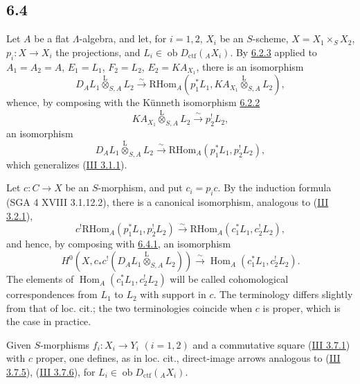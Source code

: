 \documentclass[11pt]{article}
\DeclareMathOperator{\Hom}{Hom}
\providecommand{\RHom}{\mathrm{RHom}}
\providecommand{\lten}{\overset{\mathrm L}{\otimes}}
\providecommand{\Ob}{\operatorname{ob}}
\providecommand{\RHom}{\mathrm{RHom}}
\providecommand{\Hom}{\operatorname{Hom}}
\providecommand{\lten}{\overset{\mathrm L}{\otimes}}
\providecommand{\RHom}{\mathrm R\mathcal{H}om}
\providecommand{\lten}{\overset{\mathrm L}{\otimes}}
\providecommand{\Ob}{\operatorname{ob}}
\providecommand{\lten}{\overset{\mathrm L}{\otimes}}
\providecommand{\lten}{\overset{\mathrm L}{\otimes}}
\providecommand{\Ob}{\operatorname{Ob}}
\providecommand{\lten}{\overset{\mathrm L}{\otimes}}
\providecommand{\RHom}{\mathrm{RHom}}
\providecommand{\Hom}{\operatorname{Hom}}
\providecommand{\Ob}{\operatorname{ob}}
\providecommand{\Ob}{\operatorname{Ob}}
\providecommand{\lten}{\overset{\mathrm L}{\otimes}}
\begin{document}
\subsection*{6.4}\label{sga5:IIIB:subsection:6.4}
Let $A$ be a flat $\Lambda$-algebra, and let, for $i=1,2$, $X_i$ be an $S$-scheme, $X=X_1\times_SX_2$, $p_i:X\to X_i$ the projections, and $L_i\in\Ob D_{\mathrm{ctf}}({}_AX_i)$. By \hyperref[sga5:IIIB:equation:6.2.3]{6.2.3} applied to $A_1=A_2=A$, $E_1=L_1$, $F_2=L_2$, $E_2=KA_{X_1}$, there is an isomorphism
\[
D_A L_1\lten_{S,A}L_2
\xrightarrow{\sim}
\RHom_A(p_1^*L_1,KA_{X_1}\lten_{S,A}L_2),
\]
whence, by composing with the Künneth isomorphism \hyperref[sga5:IIIB:equation:6.2.2]{6.2.2}
\[
KA_{X_1}\lten_{S,A}L_2\xrightarrow{\sim}p_2^!L_2,
\]
an isomorphism
\begin{equation}
D_AL_1\lten_{S,A}L_2
\xrightarrow{\sim}
\RHom_A(p_1^*L_1,p_2^!L_2),
\tag{6.4.1}\label{sga5:IIIB:equation:6.4.1}
\end{equation}
which generalizes (\hyperref[sga5:III:equation:3.1.1]{III 3.1.1}).

Let $c:C\to X$ be an $S$-morphism, and put $c_i=p_ic$. By the induction formula (SGA 4 XVIII 3.1.12.2), there is a canonical isomorphism, analogous to (\hyperref[sga5:III:equation:3.2.1]{III 3.2.1}),
\begin{equation}
c^!\RHom_A(p_1^*L_1,p_2^!L_2)
\xrightarrow{\sim}
\RHom_A(c_1^*L_1,c_2^!L_2),
\tag{6.4.2}\label{sga5:IIIB:equation:6.4.2}
\end{equation}
and hence, by composing with \hyperref[sga5:IIIB:equation:6.4.1]{6.4.1}, an isomorphism
\begin{equation}
H^0(X,c_*c^!(D_AL_1\lten_{S,A}L_2))
\xrightarrow{\sim}
\Hom_A(c_1^*L_1,c_2^!L_2).
\tag{6.4.3}\label{sga5:IIIB:equation:6.4.3}
\end{equation}
The elements of $\Hom_A(c_1^*L_1,c_2^!L_2)$ will be called cohomological correspondences from $L_1$ to $L_2$ with support in $c$. The terminology differs slightly from that of loc. cit.; the two terminologies coincide when $c$ is proper, which is the case in practice.

Given $S$-morphisms $f_i:X_i\to Y_i$ $(i=1,2)$ and a commutative square (\hyperref[sga5:III:equation:3.7.1]{III 3.7.1}) with $c$ proper, one defines, as in loc. cit., direct-image arrows analogous to (\hyperref[sga5:III:equation:3.7.5]{III 3.7.5}), (\hyperref[sga5:III:equation:3.7.6]{III 3.7.6}), for $L_i\in\Ob D_{\mathrm{ctf}}({}_AX_i)$.
\end{document}
